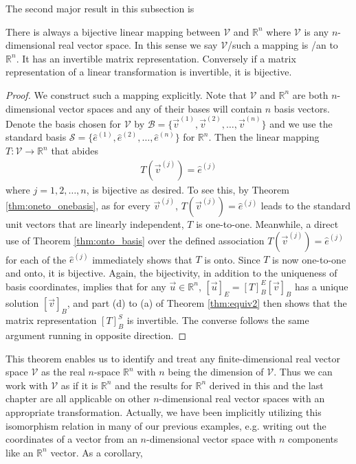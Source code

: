 The second major result in this subsection is
\begin{thm}
\label{thm:isomorphism}
There is always a bijective linear mapping between $\mathcal{V}$ and $\mathbb{R}^n$ where $\mathcal{V}$ is any $n$-dimensional real vector space. In this sense we say $\mathcal{V}$/such a mapping is /an  to $\mathbb{R}^n$. It has an invertible matrix representation. Conversely if a matrix representation of a linear transformation is invertible, it is bijective.
\end{thm}
\begin{proof}
We construct such a mapping explicitly. Note that $\mathcal{V}$ and $\mathbb{R}^n$ are both $n$-dimensional vector spaces and any of their bases will contain $n$ basis vectors. Denote the basis chosen for $\mathcal{V}$ by $\mathcal{B} = \{\vec{v}^{(1)}, \vec{v}^{(2)}, \ldots, \vec{v}^{(n)}\}$ and we use the standard basis $\mathcal{S} = \{\hat{e}^{(1)}, \hat{e}^{(2)}, \ldots, \hat{e}^{(n)}\}$ for $\mathbb{R}^n$. Then the linear mapping $T: \mathcal{V} \to \mathbb{R}^n$ that abides
\begin{align*}
T(\vec{v}^{(j)}) = \hat{e}^{(j)}    
\end{align*}
where $j = 1,2,\ldots,n$, is bijective as desired. To see this, by Theorem \ref{thm:oneto_onebasis}, as for every $\vec{v}^{(j)}$, $T(\vec{v}^{(j)}) = \hat{e}^{(j)}$ leads to the standard unit vectors that are linearly independent, $T$ is one-to-one. Meanwhile, a direct use of Theorem \ref{thm:onto_basis} over the defined association $T(\vec{v}^{(j)}) = \hat{e}^{(j)}$ for each of the $\hat{e}^{(j)}$ immediately shows that $T$ is onto. Since $T$ is now one-to-one and onto, it is bijective. Again, the bijectivity, in addition to the uniqueness of basis coordinates, implies that for any $\vec{u} \in \mathbb{R}^n$, $[\vec{u}]_E = [T]_B^E[\vec{v}]_B$ has a unique solution $[\vec{v}]_B$, and part (d) to (a) of Theorem \ref{thm:equiv2} then shows that the matrix representation $[T]_B^S$ is invertible. The converse follows the same argument running in opposite direction.
\end{proof}
This theorem enables us to identify and treat any finite-dimensional real vector space $\mathcal{V}$ as the real $n$-space $\mathbb{R}^n$ with $n$ being the dimension of $\mathcal{V}$. Thus we can work with $\mathcal{V}$ as if it is $\mathbb{R}^n$ and the results for $\mathbb{R}^n$ derived in this and the last chapter are all applicable on other $n$-dimensional real vector spaces with an appropriate transformation. Actually, we have been implicitly utilizing this isomorphism relation in many of our previous examples, e.g. writing out the coordinates of a vector from an $n$-dimensional vector space with $n$ components like an $\mathbb{R}^n$ vector. As a corollary,
